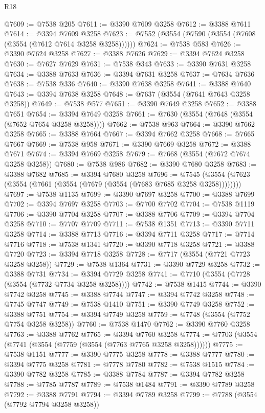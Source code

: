 \begin{lexlean}{R18}
\begin{coremodule}
@7609 := @7538 @205
@7611 := @3390 @7609 @3258
@7612 := @3388 @7611
@7614 := @3394 @7609 @3258
@7623 := @7552 (@3554 (@7590 (@3554 (@7608 (@3554 (@7612 @7614 @3258 @3258))))))
@7624 := @7538 @583
@7626 := @3390 @7624 @3258
@7627 := @3388 @7626
@7629 := @3394 @7624 @3258
@7630 := @7627 @7629
@7631 := @7538 @343
@7633 := @3390 @7631 @3258
@7634 := @3388 @7633
@7636 := @3394 @7631 @3258
@7637 := @7634 @7636
@7638 := @7538 @336
@7640 := @3390 @7638 @3258
@7641 := @3388 @7640
@7643 := @3394 @7638 @3258
@7648 := @7637 (@3554 (@7641 @7643 @3258 @3258))
@7649 := @7538 @577
@7651 := @3390 @7649 @3258
@7652 := @3388 @7651
@7654 := @3394 @7649 @3258
@7661 := @7630 (@3554 (@7648 (@3554 (@7652 @7654 @3258 @3258))))
@7662 := @7538 @963
@7664 := @3390 @7662 @3258
@7665 := @3388 @7664
@7667 := @3394 @7662 @3258
@7668 := @7665 @7667
@7669 := @7538 @958
@7671 := @3390 @7669 @3258
@7672 := @3388 @7671
@7674 := @3394 @7669 @3258
@7679 := @7668 (@3554 (@7672 @7674 @3258 @3258))
@7680 := @7538 @986
@7682 := @3390 @7680 @3258
@7683 := @3388 @7682
@7685 := @3394 @7680 @3258
@7696 := @7545 (@3554 (@7623 (@3554 (@7661 (@3554 (@7679 (@3554 (@7683 @7685 @3258 @3258))))))))
@7697 := @7538 @1135
@7699 := @3390 @7697 @3258
@7700 := @3388 @7699
@7702 := @3394 @7697 @3258
@7703 := @7700 @7702
@7704 := @7538 @1119
@7706 := @3390 @7704 @3258
@7707 := @3388 @7706
@7709 := @3394 @7704 @3258
@7710 := @7707 @7709
@7711 := @7538 @1351
@7713 := @3390 @7711 @3258
@7714 := @3388 @7713
@7716 := @3394 @7711 @3258
@7717 := @7714 @7716
@7718 := @7538 @1341
@7720 := @3390 @7718 @3258
@7721 := @3388 @7720
@7723 := @3394 @7718 @3258
@7728 := @7717 (@3554 (@7721 @7723 @3258 @3258))
@7729 := @7538 @1364
@7731 := @3390 @7729 @3258
@7732 := @3388 @7731
@7734 := @3394 @7729 @3258
@7741 := @7710 (@3554 (@7728 (@3554 (@7732 @7734 @3258 @3258))))
@7742 := @7538 @1415
@7744 := @3390 @7742 @3258
@7745 := @3388 @7744
@7747 := @3394 @7742 @3258
@7748 := @7745 @7747
@7749 := @7538 @1410
@7751 := @3390 @7749 @3258
@7752 := @3388 @7751
@7754 := @3394 @7749 @3258
@7759 := @7748 (@3554 (@7752 @7754 @3258 @3258))
@7760 := @7538 @1470
@7762 := @3390 @7760 @3258
@7763 := @3388 @7762
@7765 := @3394 @7760 @3258
@7774 := @7703 (@3554 (@7741 (@3554 (@7759 (@3554 (@7763 @7765 @3258 @3258))))))
@7775 := @7538 @1151
@7777 := @3390 @7775 @3258
@7778 := @3388 @7777
@7780 := @3394 @7775 @3258
@7781 := @7778 @7780
@7782 := @7538 @1515
@7784 := @3390 @7782 @3258
@7785 := @3388 @7784
@7787 := @3394 @7782 @3258
@7788 := @7785 @7787
@7789 := @7538 @1484
@7791 := @3390 @7789 @3258
@7792 := @3388 @7791
@7794 := @3394 @7789 @3258
@7799 := @7788 (@3554 (@7792 @7794 @3258 @3258))

\end{coremodule}
\end{lexlean}
